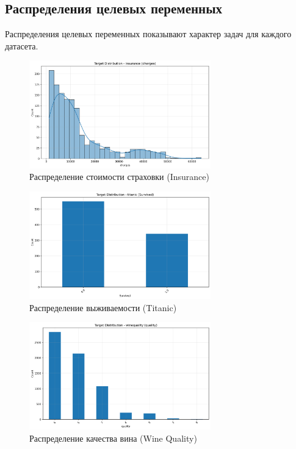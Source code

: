 \documentclass[a4paper]{article}
\begin{document}
\subsection{Распределения целевых переменных}

Распределения целевых переменных показывают характер задач для каждого датасета.

\begin{figure}[H]
\centering
\includegraphics[width=0.7\textwidth]{images/target_distribution_insurance.png}
\caption{Распределение стоимости страховки (Insurance)}
\end{figure}

\begin{figure}[H]
\centering
\includegraphics[width=0.7\textwidth]{images/target_distribution_titanic.png}
\caption{Распределение выживаемости (Titanic)}
\end{figure}

\begin{figure}[H]
\centering
\includegraphics[width=0.7\textwidth]{images/target_distribution_winequality.png}
\caption{Распределение качества вина (Wine Quality)}
\end{figure}
\end{document}
